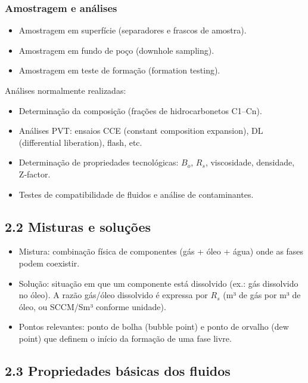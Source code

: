 \documentclass[11pt,a4paper]{article}
\begin{document}
\subsubsection{Amostragem e análises}
\begin{itemize}
\item Amostragem em superfície (separadores e frascos de amostra).
\item Amostragem em fundo de poço (downhole sampling).
\item Amostragem em teste de formação (formation testing).
\end{itemize}

Análises normalmente realizadas:
\begin{itemize}
\item Determinação da composição (frações de hidrocarbonetos C1–Cn).
\item Análises PVT: ensaios CCE (constant composition expansion), DL (differential liberation), flash, etc.
\item Determinação de propriedades tecnológicas: $B_o$, $R_s$, viscosidade, densidade, Z‑factor.
\item Testes de compatibilidade de fluidos e análise de contaminantes.
\end{itemize}

\subsection{2.2 Misturas e soluções}
\begin{itemize}
\item Mistura: combinação física de componentes (gás + óleo + água) onde as fases podem coexistir.
\item Solução: situação em que um componente está dissolvido (ex.: gás dissolvido no óleo). A razão gás/óleo dissolvido é expressa por $R_s$ (m³ de gás por m³ de óleo, ou SCCM/Sm³ conforme unidade).
\item Pontos relevantes: ponto de bolha (bubble point) e ponto de orvalho (dew point) que definem o início da formação de uma fase livre.
\end{itemize}

\subsection{2.3 Propriedades básicas dos fluidos}
\end{document}

